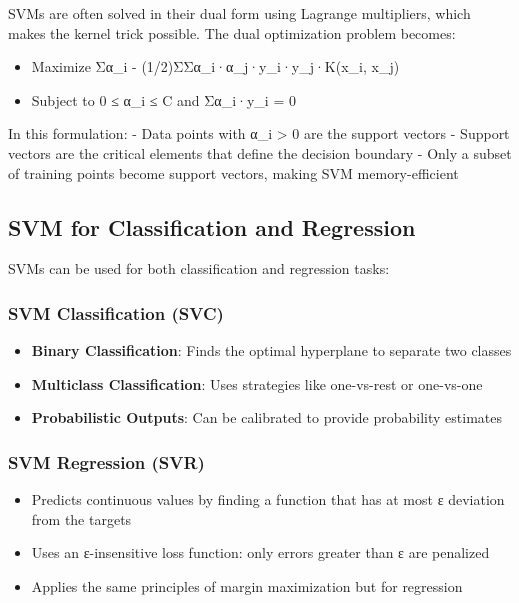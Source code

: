 \documentclass[
  letterpaper,
  DIV=11,
  numbers=noendperiod]{scrreprt}
\providecommand{\tightlist}{%
  \setlength{\itemsep}{0pt}\setlength{\parskip}{0pt}}\usepackage{longtable,booktabs,array}
\begin{document}
SVMs are often solved in their dual form using Lagrange multipliers,
which makes the kernel trick possible. The dual optimization problem
becomes:

\begin{itemize}
\tightlist
\item
  Maximize Σα\_i - (1/2)ΣΣα\_i·α\_j·y\_i·y\_j·K(x\_i, x\_j)
\item
  Subject to 0 ≤ α\_i ≤ C and Σα\_i·y\_i = 0
\end{itemize}

In this formulation: - Data points with α\_i \textgreater{} 0 are the
support vectors - Support vectors are the critical elements that define
the decision boundary - Only a subset of training points become support
vectors, making SVM memory-efficient

\subsection{SVM for Classification and
Regression}\label{svm-for-classification-and-regression}

SVMs can be used for both classification and regression tasks:

\subsubsection{SVM Classification (SVC)}\label{svm-classification-svc}

\begin{itemize}
\tightlist
\item
  \textbf{Binary Classification}: Finds the optimal hyperplane to
  separate two classes
\item
  \textbf{Multiclass Classification}: Uses strategies like one-vs-rest
  or one-vs-one
\item
  \textbf{Probabilistic Outputs}: Can be calibrated to provide
  probability estimates
\end{itemize}

\subsubsection{SVM Regression (SVR)}\label{svm-regression-svr}

\begin{itemize}
\tightlist
\item
  Predicts continuous values by finding a function that has at most ε
  deviation from the targets
\item
  Uses an ε-insensitive loss function: only errors greater than ε are
  penalized
\item
  Applies the same principles of margin maximization but for regression
\end{itemize}
\end{document}
